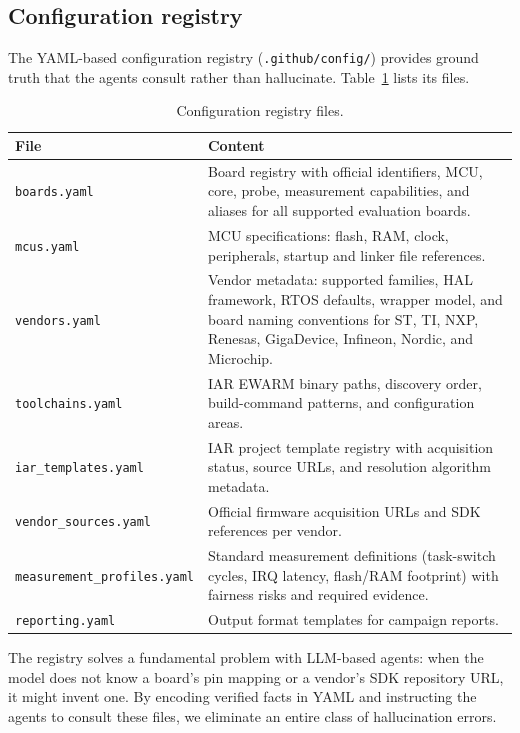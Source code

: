 \subsection{Configuration registry}
\label{sec:agent-config-registry}

The YAML-based configuration registry (\texttt{.github/config/}) provides ground truth
that the agents consult rather than hallucinate. Table~\ref{tab:agent-config-files} lists
its files.

\begin{table}[H]
\centering
\caption{Configuration registry files.}
\label{tab:agent-config-files}
\begin{tabularx}{\textwidth}{l X}
\toprule
\textbf{File} & \textbf{Content} \\
\midrule
\texttt{boards.yaml} & Board registry with official identifiers, MCU, core, probe, measurement capabilities, and aliases for all supported evaluation boards. \\
\texttt{mcus.yaml} & MCU specifications: flash, RAM, clock, peripherals, startup and linker file references. \\
\texttt{vendors.yaml} & Vendor metadata: supported families, HAL framework, RTOS defaults, wrapper model, and board naming conventions for ST, TI, NXP, Renesas, GigaDevice, Infineon, Nordic, and Microchip. \\
\texttt{toolchains.yaml} & IAR EWARM binary paths, discovery order, build-command patterns, and configuration areas. \\
\texttt{iar\_templates.yaml} & IAR project template registry with acquisition status, source URLs, and resolution algorithm metadata. \\
\texttt{vendor\_sources.yaml} & Official firmware acquisition URLs and SDK references per vendor. \\
\texttt{measurement\_profiles.yaml} & Standard measurement definitions (task-switch cycles, IRQ latency, flash/RAM footprint) with fairness risks and required evidence. \\
\texttt{reporting.yaml} & Output format templates for campaign reports. \\
\bottomrule
\end{tabularx}
\end{table}

The registry solves a fundamental problem with LLM-based agents: when the model does not
know a board's pin mapping or a vendor's SDK repository URL, it might invent one. By
encoding verified facts in YAML and instructing the agents to consult these files, we
eliminate an entire class of hallucination errors.

